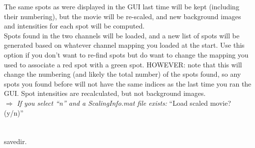 \documentclass[11pt]{article}
\begin{document}
\indent\indent{} The same spots as were displayed in the GUI last
\indent\indent\indent\indent  time will be kept (including their numbering), but the movie will be re-scaled, and new
\indent\indent\indent\indent background images and intensities for each spot will be computed.\\

\indent\indent{} Spots found in the two channels will be loaded, and a new list of spots 
\indent\indent\indent\indent will be generated based on whatever channel mapping you loaded at the start.  Use  
\indent\indent\indent\indent this option if you don't want to re-find spots but do want to change the mapping you  
\indent\indent\indent\indent used to associate a red spot with a green spot.  HOWEVER: note that this will change 
\indent\indent\indent\indent the numbering (and likely the total number) of the spots found, so any spots you found 
\indent\indent\indent\indent before will not have the same indices as the last time you ran the GUI.  Spot intensities 
\indent\indent\indent\indent are recalculated, but not background images.\\

\indent\indent $\Rightarrow$ {\it If you select ``n'' and a ScalingInfo.mat file exists:} ``Load scaled movie? (y/n)''\\

\indent\indent\indent{}\\

\indent\indent\indent{}\\

 savedir.

\newpage

%
%
%
\end{document}
